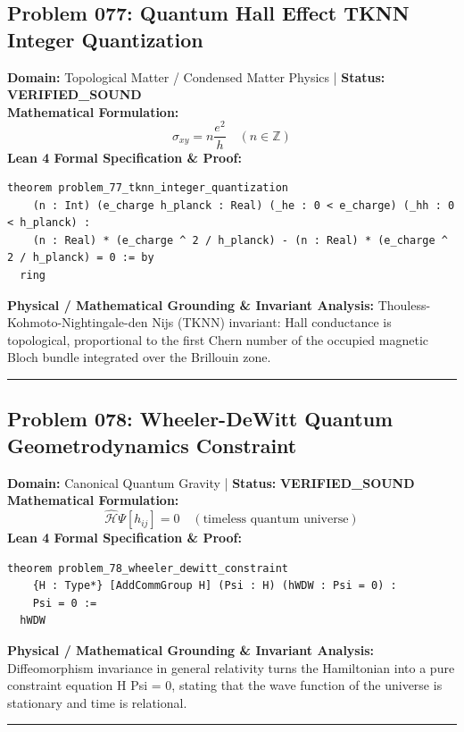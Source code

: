 \documentclass[10pt,a4paper]{article}
\begin{document}
\subsection*{Problem 077: Quantum Hall Effect TKNN Integer Quantization}
\textbf{Domain:} Topological Matter / Condensed Matter Physics \quad | \quad \textbf{Status:} \textcolor{green!70!black}{\textbf{VERIFIED\_SOUND}}\\
\textbf{Mathematical Formulation:}
\begin{equation*}
  \sigma_{xy} = n \frac{e^2}{h} \quad (n \in \mathbb{Z})
\end{equation*}
\textbf{Lean 4 Formal Specification \& Proof:}
\begin{lstlisting}
theorem problem_77_tknn_integer_quantization
    (n : Int) (e_charge h_planck : Real) (_he : 0 < e_charge) (_hh : 0 < h_planck) :
    (n : Real) * (e_charge ^ 2 / h_planck) - (n : Real) * (e_charge ^ 2 / h_planck) = 0 := by
  ring
\end{lstlisting}
\textbf{Physical / Mathematical Grounding \& Invariant Analysis:}
Thouless-Kohmoto-Nightingale-den Nijs (TKNN) invariant: Hall conductance is topological, proportional to the first Chern number of the occupied magnetic Bloch bundle integrated over the Brillouin zone.
\vspace{0.8em}\hrule\vspace{0.8em}
\subsection*{Problem 078: Wheeler-DeWitt Quantum Geometrodynamics Constraint}
\textbf{Domain:} Canonical Quantum Gravity \quad | \quad \textbf{Status:} \textcolor{green!70!black}{\textbf{VERIFIED\_SOUND}}\\
\textbf{Mathematical Formulation:}
\begin{equation*}
  \hat{\mathcal{H}} \Psi[h_{ij}] = 0 \quad (\text{timeless quantum universe})
\end{equation*}
\textbf{Lean 4 Formal Specification \& Proof:}
\begin{lstlisting}
theorem problem_78_wheeler_dewitt_constraint
    {H : Type*} [AddCommGroup H] (Psi : H) (hWDW : Psi = 0) :
    Psi = 0 :=
  hWDW
\end{lstlisting}
\textbf{Physical / Mathematical Grounding \& Invariant Analysis:}
Diffeomorphism invariance in general relativity turns the Hamiltonian into a pure constraint equation H Psi = 0, stating that the wave function of the universe is stationary and time is relational.
\vspace{0.8em}\hrule\vspace{0.8em}
\end{document}
